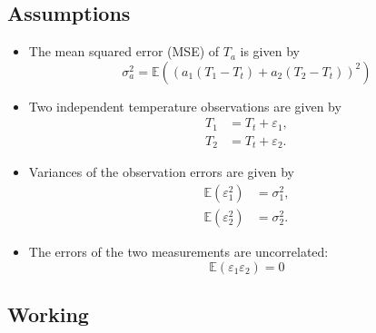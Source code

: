 \subsection{Assumptions}
\label{sub:mse:assumptions}

\begin{itemize}
    \item The mean squared error (MSE) of $T_a$ is given by
    \begin{equation}
        \sigma_a^2 = \mathbb{E} \left( \left( a_1 \left( T_1 - T_t \right) + a_2 \left( T_2 - T_t \right) \right)^2 \right) \label{eq:ta_mse}
    \end{equation}
    \item Two independent temperature observations are given by
    \begin{subequations}
        \begin{align}
        T_1 &= T_t + \varepsilon_1, \\
        T_2 &= T_t + \varepsilon_2.
        \end{align}
        \label{:eq:t_independence}
    \end{subequations}
    \item Variances of the observation errors are given by
    \begin{subequations}
        \begin{align}
            \mathbb{E}(\varepsilon_1^2) &= \sigma_1^2, \\
            \mathbb{E}(\varepsilon_2^2) &= \sigma_2^2.
        \end{align}
        \label{eq:t_var}
    \end{subequations}
    \item The errors of the two measurements are uncorrelated:
    \begin{equation}
        \mathbb{E}(\varepsilon_1 \varepsilon_2) = 0 \label{eq:t_uncorrelated}
    \end{equation}
\end{itemize}

\subsection{Working}
\label{sub:mse:working}

